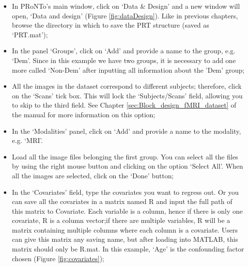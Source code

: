 \begin{itemize}
	
	\item In PRoNTo's main window, click on `Data \& Design' and a new window will open, `Data and design' (Figure \ref{fig:dataDesign}). Like in previous chapters, browse the directory in which to save the PRT structure (saved as `PRT.mat'); 
	
	\item In the panel ‘Groups’, click on ‘Add’ and provide a name to the group, e.g. `Dem'. Since in this example we have two groups, it is necessary to add one more called `Non-Dem' after inputting all information about the 'Dem' group;
	
	\item All the images in the dataset correspond to different subjects; therefore, click on the ‘Scans’ tick box. This will lock the ‘Subjects/Scans’ field, allowing you to skip to the third field. See Chapter \ref{sec:Block_design_fMRI_dataset} of the manual for more information on this option; 
	
	\item In the `Modalities' panel, click on `Add' and provide a name to the modality, e.g. `MRI'.
	
	\item Load all the image files belonging the first group. You can select all the files by using the right mouse button and clicking on the option `Select All'. When all the images are selected, click on the `Done' button;
	
	\item In the `Covariates' field, type the covariates you want to regress out. Or you can save all the covariates in a matrix named R and input the full path of this matrix to Covariate. Each variable is a column, hence if there is only one covariate, R is a column vector;if there are multiple variables, R will be a matrix containing multiple columns where each column is a covariate. Users can give this matrix any saving name, but after loading into MATLAB, this matrix should only be R.mat. In this example, `Age' is the confounding factor chosen (Figure \ref{fig:covariates});
	

\end{itemize}
